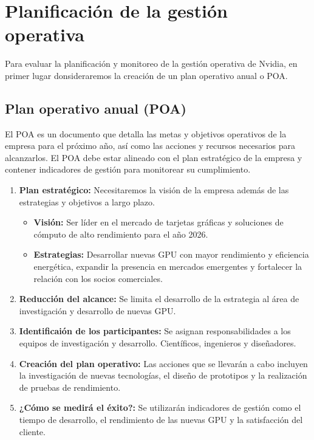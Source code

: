 \documentclass{article}
\begin{document}
\newpage

\section{Planificación de la gestión operativa}
\vspace{-0.5cm}
Para evaluar la planificación y monitoreo de la gestión operativa de Nvidia, en primer lugar donsideraremos la creación de un plan operativo anual o POA.
\vspace{-0.5cm}
\subsection{Plan operativo anual (POA)}
\vspace{-0.5cm}
El POA es un documento que detalla las metas y objetivos operativos de la empresa para el próximo año, así como las acciones y recursos necesarios para alcanzarlos. El POA debe estar alineado con el plan estratégico de la empresa y contener indicadores de gestión para monitorear su cumplimiento.
\vspace{-0.5cm}
\begin{enumerate}
  \item \textbf{Plan estratégico:} Necesitaremos la visión de la empresa además de las estrategias y objetivos a largo plazo.
  \begin{itemize}
    \item \textbf{Visión:} Ser líder en el mercado de tarjetas gráficas y soluciones de cómputo de alto rendimiento para el año 2026.
    \item \textbf{Estrategias:} Desarrollar nuevas GPU con mayor rendimiento y eficiencia energética, expandir la presencia en mercados emergentes y fortalecer la relación con los socios comerciales. 
  \end{itemize}
  \item \textbf{Reducción del alcance:} Se limita el desarrollo de la estrategia al área de investigación y desarrollo de nuevas GPU.
  \item \textbf{Identificaión de los participantes:} Se asignan responsabilidades a los equipos de investigación y desarrollo. Científicos, ingenieros y diseñadores.
  \item \textbf{Creación del plan operativo:} Las acciones que se llevarán a cabo incluyen la investigación de nuevas tecnologías, el diseño de prototipos y la realización de pruebas de rendimiento.
  \item \textbf{¿Cómo se medirá el éxito?:} Se utilizarán indicadores de gestión como el tiempo de desarrollo, el rendimiento de las nuevas GPU y la satisfacción del cliente.
\end{enumerate}
\end{document}
